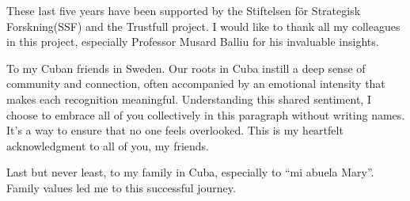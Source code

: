 {These last five years have been supported by the Stiftelsen för Strategisk Forskning(SSF) and the Trustfull project. I would like to thank all my colleagues in this project, especially Professor Musard Balliu for his invaluable insights.

To my Cuban friends in Sweden. Our roots in Cuba instill a deep sense of community and connection, often accompanied by an emotional intensity that makes each recognition meaningful. Understanding this shared sentiment, I choose to embrace all of you collectively in this paragraph without writing names. It's a way to ensure that no one feels overlooked. This is my heartfelt acknowledgment to all of you, my friends.

Last but never least, to my family in Cuba, especially to “mi abuela Mary”. Family values led me to this successful journey.
}